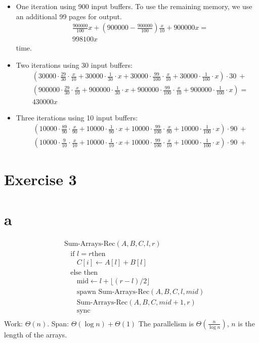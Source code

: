 \documentclass[koma,a4paper]{article}
\begin{document}
\begin{itemize}
  \item One iteration using 900 input buffers. To use the remaining memory, we use an additional 99 pages for output. \begin{align*}
      &\frac{900000}{100}x + \left(900000 - \frac{900000}{100}\right) \frac{x}{10} + 900000 x =\\
      &998100x
    \end{align*} time.
  \item Two iterations using 30 input buffers: \begin{align*}
    &\left(30000 \cdot \frac{29}{30} \cdot \frac{x}{10} + 30000 \cdot \frac{1}{30} \cdot x + 30000 \cdot \frac{99}{100} \cdot \frac{x}{10} + 30000 \cdot \frac{1}{100} \cdot x\right) \cdot 30~+\\
    &\left(900000 \cdot \frac{29}{30} \cdot \frac{x}{10} + 900000 \cdot \frac{1}{30} \cdot x + 900000 \cdot \frac{99}{100} \cdot \frac{x}{10} + 900000 \cdot \frac{1}{100} \cdot x\right) =\\ &430000x
  \end{align*}
  \item Three iterations using 10 input buffers: \begin{align*}
    &\left(10000 \cdot \frac{89}{90} \cdot \frac{x}{90} + 10000 \cdot \frac{1}{90} \cdot x + 10000 \cdot \frac{99}{100} \cdot \frac{x}{90} + 10000 \cdot \frac{1}{100} \cdot x\right) \cdot 90~+\\
    &\left(10000 \cdot \frac{9}{10} \cdot \frac{x}{10} + 10000 \cdot \frac{1}{10} \cdot x + 10000 \cdot \frac{99}{100} \cdot \frac{x}{10} + 10000 \cdot \frac{1}{100} \cdot x\right) \cdot 90~+
  \end{align*}
\end{itemize}

\section{Exercise 3}

\section{a}
\begin{align*}
  &\text{Sum-Arrays-Rec}(A, B, C, l, r)\\
  &~~~~\text{if } l = r \text{then}\\
  &~~~~~~~~C[i] \leftarrow A[l] + B[l]\\
  &~~~~\text{else then}\\
  &~~~~~~~~\text{mid} \leftarrow l+\lfloor (r - l)/2 \rfloor\\
  &~~~~~~~~\text{spawn Sum-Arrays-Rec}(A, B, C, l, mid)\\
  &~~~~~~~~\text{Sum-Arrays-Rec}(A, B, C, mid+1, r)\\
  &~~~~~~~~\text{sync}\\
\end{align*}
Work: $\Theta(n)$. Span: $\Theta(\log n) + \Theta(1)$ The parallelism is $\Theta(\frac{n}{\log n})$, $n$ is the length of the arrays.
\end{document}
